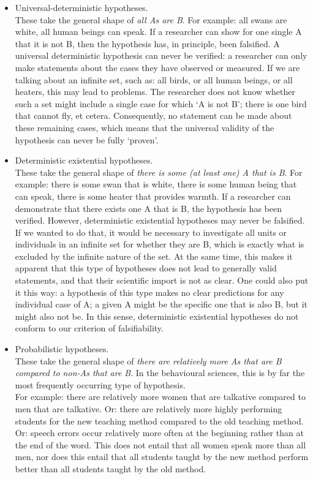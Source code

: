 \documentclass[
]{book}
\begin{document}
\begin{itemize}
\item
  Universal-deterministic hypotheses.\\
  These take the general shape of \emph{all As are B}. For example: all swans are white, all human beings can speak. If a researcher can show for one single A that it is not B, then the hypothesis has, in principle, been falsified. A universal deterministic hypothesis can never be verified: a researcher can only make statements about the cases they have observed or measured. If we are talking about an infinite set, such as: all birds, or all human beings, or all heaters, this may lead to problems. The researcher does not know whether such a set might include a single case for which `A is not B'; there is one bird that cannot fly, et cetera. Consequently, no statement can be made about these remaining cases, which means that the universal validity of the hypothesis can never be fully `proven'.
\item
  Deterministic existential hypotheses.\\
  These take the general shape of \emph{there is some (at least one) A that is B}. For example: there is some swan that is white, there is some human being that can speak, there is some heater that provides warmth. If a researcher can demonstrate that there exists one A that is B, the hypothesis has been verified. However, deterministic existential hypotheses may never be falsified. If we wanted to do that, it would be necessary to investigate all units or individuals in an infinite set for whether they are B, which is exactly what is excluded by the infinite nature of the set. At the same time, this makes it apparent that this type of hypotheses does not lead to generally valid statements, and that their scientific import is not as clear. One could also put it this way: a hypothesis of this type makes no clear predictions for any individual case of A; a given A might be the specific one that is also B, but it might also not be. In this sense, deterministic existential hypotheses do not conform to our criterion of falsifiability.
\item
  Probabilistic hypotheses.\\
  These take the general shape of \emph{there are relatively more As that are B compared to non-As that are B}. In the behavioural sciences, this is by far the most frequently occurring type of hypothesis.\\
  For example: there are relatively more women that are talkative compared to men that are talkative. Or: there are relatively more highly performing students for the new teaching method compared to the old teaching method. Or: speech errors occur relatively more often at the beginning rather than at the end of the word. This does not entail that all women speak more than all men, nor does this entail that all students taught by the new method perform better than all students taught by the old method.
\end{itemize}
\end{document}
